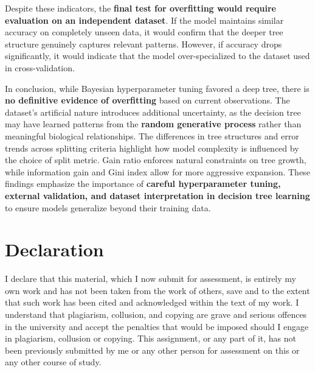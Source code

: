 \documentclass[12pt]{article}
\begin{document}
Despite these indicators, the \textbf{final test for overfitting would require evaluation on an independent dataset}. If the model maintains similar accuracy on completely unseen data, it would confirm that the deeper tree structure genuinely captures relevant patterns. However, if accuracy drops significantly, it would indicate that the model over-specialized to the dataset used in cross-validation.

In conclusion, while Bayesian hyperparameter tuning favored a deep tree, there is \textbf{no definitive evidence of overfitting} based on current observations. The dataset’s artificial nature introduces additional uncertainty, as the decision tree may have learned patterns from the \textbf{random generative process} rather than meaningful biological relationships. The differences in tree structures and error trends across splitting criteria highlight how model complexity is influenced by the choice of split metric. Gain ratio enforces natural constraints on tree growth, while information gain and Gini index allow for more aggressive expansion. These findings emphasize the importance of \textbf{careful hyperparameter tuning, external validation, and dataset interpretation in decision tree learning} to ensure models generalize beyond their training data.

\section*{Declaration}

I declare that this material, which I now submit for assessment, is entirely my own work and has not been taken from the work of others, save and to the extent that such work has been cited and acknowledged within the text of my work. I understand that plagiarism, collusion, and copying are grave and serious offences in the university and accept the penalties that would be imposed should I engage in plagiarism, collusion or copying. This assignment, or any part of it, has not been previously submitted by me or any other person for assessment on this or any other course of study.
\end{document}
